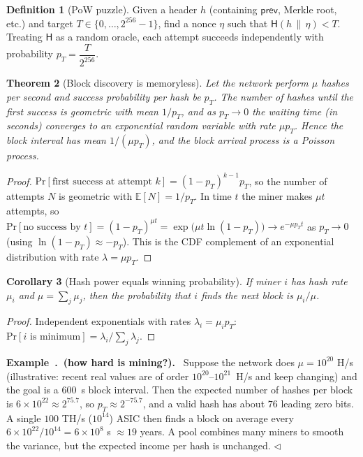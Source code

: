 \documentclass[11pt,a4paper]{article}
\newcounter{exn}[section]
\renewcommand{\theexn}{\thesection.\arabic{exn}}
\newenvironment{formal}{\par\smallskip}{\par\smallskip}
\newenvironment{exbox}[1][]{\par\medskip\refstepcounter{exn}\noindent\textbf{Example~\theexn\if\relax\detokenize{#1}\relax\else\ (#1)\fi.}\ \ignorespaces}{\hfill$\triangleleft$\par\medskip}
\theoremstyle{definition}
\newtheorem{definition}{Definition}[section]
\theoremstyle{plain}
\newtheorem{theorem}[definition]{Theorem}
\newtheorem{corollary}[definition]{Corollary}
\theoremstyle{remark}
\newcommand{\Hash}{\mathsf{H}}
\newcommand{\concat}{\,\|\,}
\newcommand{\E}{\mathbb{E}}
\renewcommand{\Pr}{\mathrm{Pr}}
\begin{document}
\begin{formal}
\begin{definition}[PoW puzzle]
Given a header $h$ (containing $\mathsf{prev}$, Merkle root, etc.) and target $T\in\{0,\dots,2^{256}-1\}$, find a nonce $\eta$ such that $\Hash(h\concat\eta)<T$.
Treating $\Hash$ as a random oracle, each attempt succeeds independently with probability $p_T=\dfrac{T}{2^{256}}$.
\end{definition}

\begin{theorem}[Block discovery is memoryless]\label{thm:expo}
Let the network perform $\mu$ hashes per second and success probability per hash be $p_T$. The number of hashes until the first success is geometric with mean $1/p_T$, and as $p_T\to0$ the
waiting time (in seconds) converges to an exponential random variable with rate $\mu p_T$. Hence the block interval has mean $1/(\mu p_T)$, and the block arrival process is a Poisson process.
\end{theorem}
\begin{proof}
$\Pr[\text{first success at attempt }k]=(1-p_T)^{k-1}p_T$, so the number of attempts $N$ is geometric with $\E[N]=1/p_T$. In time $t$ the miner makes $\mu t$ attempts, so
$\Pr[\text{no success by }t]=(1-p_T)^{\mu t}=\exp\!\big(\mu t\ln(1-p_T)\big)\to e^{-\mu p_T t}$ as $p_T\to0$ (using $\ln(1-p_T)\approx-p_T$).
This is the CDF complement of an exponential distribution with rate $\lambda=\mu p_T$.
\end{proof}

\begin{corollary}[Hash power equals winning probability]
If miner $i$ has hash rate $\mu_i$ and $\mu=\sum_j\mu_j$, then the probability that $i$ finds the next block is $\mu_i/\mu$.
\end{corollary}
\begin{proof}
Independent exponentials with rates $\lambda_i=\mu_ip_T$: $\Pr[\text{$i$ is minimum}]=\lambda_i/\sum_j\lambda_j$.
\end{proof}
\end{formal}

\begin{exbox}[how hard is mining?]\label{ex:hardness}
Suppose the network does $\mu=10^{20}$ H/s (illustrative: recent real values are of order $10^{20}$--$10^{21}$~H/s and keep changing) and the goal is a $600$~s block interval. Then the expected number of hashes per block is $6\times10^{22}\approx2^{75.7}$,
so $p_T\approx2^{-75.7}$, and a valid hash has about $76$ leading zero bits. A single $100$ TH/s ($10^{14}$) ASIC then finds a block on average every
$6\times10^{22}/10^{14}=6\times10^8$ s $\approx 19$ years. A pool combines many miners to smooth the variance, but the expected income per hash is unchanged.
\end{exbox}
\end{document}
